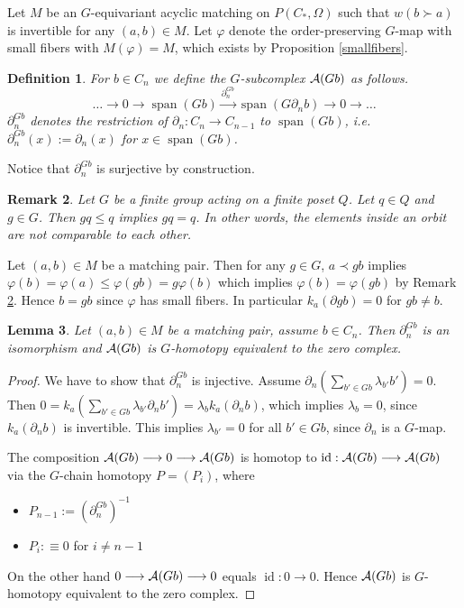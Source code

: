 \documentclass{elsarticle}
\newtheorem{df}{Definition}[section]
\newtheorem{lem}[df]{Lemma}
\newtheorem{rem}[df]{Remark}
\def\id{\operatorname{id}}
\def\span{\operatorname{span}}
\begin{document}
Let $M$ be an $G$-equivariant acyclic matching on $P(C_*,\Omega)$ such that $w(b\succ a)$ is invertible for any $(a,b)\in M$. Let $\varphi$ denote the order-preserving $G$-map with small fibers with $M(\varphi)=M$, which exists by Proposition \ref{smallfibers}.
\begin{df}
For $b\in C_n$ we define the $G$-subcomplex ${\cal A}(Gb)$ as follows.
\[\dots\longrightarrow 0\longrightarrow\span(Gb)\overset{\partial^{Gb}_n}\longrightarrow\span(G\partial_n b)\longrightarrow 0\longrightarrow\dots\]
$\partial^{Gb}_n$ denotes the restriction of $\partial_n:C_n\longrightarrow C_{n-1}$ to $\span(Gb)$, i.e. $\partial^{Gb}_n(x):=\partial_n(x)$ for $x\in\span(Gb)$.
\end{df}
Notice that $\partial^{Gb}_n$ is surjective by construction.
\begin{rem}
\label{poset_orbit}
Let $G$ be a finite group acting on a finite poset $Q$. Let $q\in Q$ and $g\in G$. Then $gq\leq q$ implies $gq=q$. In other words, the elements inside an orbit are not comparable to each other.
\end{rem}
Let $(a,b)\in M$ be a matching pair. Then for any $g\in G$, $a\prec gb$ implies $\varphi(b)=\varphi(a)\leq\varphi(gb)=g\varphi(b)$ which implies $\varphi(b)=\varphi(gb)$ by Remark \ref{poset_orbit}. Hence $b=gb$ since $\varphi$ has small fibers. In particular $k_a(\partial gb)=0$ for $gb\not=b$.
\begin{lem}
\label{iso}
Let $(a,b)\in M$ be a matching pair, assume $b\in C_n$. Then $\partial^{Gb}_n$ is an isomorphism and ${\cal A}(Gb)$ is $G$-homotopy equivalent to the zero complex.
\end{lem}
\begin{proof}
We have to show that $\partial^{Gb}_n$ is injective. Assume $\partial_n(\sum_{b'\in Gb}\lambda_{b'}b')=0$. Then $0=k_a(\sum_{b'\in Gb}\lambda_{b'}\partial_nb')=\lambda_{b}k_a(\partial_nb)$, which implies $\lambda_b=0$, since $k_a(\partial_nb)$ is invertible. This implies $\lambda_{b'}=0$ for all $b'\in Gb$, since $\partial_n$ is a $G$-map.

The composition ${\cal A}(Gb)\longrightarrow0\longrightarrow{\cal A}(Gb)$ is homotop to $\id:{\cal A}(Gb)\longrightarrow{\cal A}(Gb)$ via the $G$-chain homotopy $P=(P_i)$, where
\begin{itemize}
\item $P_{n-1}:=(\partial^{Gb}_n)^{-1}$
\item $P_i:\equiv 0$ for $i\not=n-1$
\end{itemize}
On the other hand $0\longrightarrow{\cal A}(Gb)\longrightarrow 0$ equals $\id:0\longrightarrow 0$. Hence ${\cal A}(Gb)$ is $G$-homotopy equivalent to the zero complex.
\end{proof}
\end{document}
